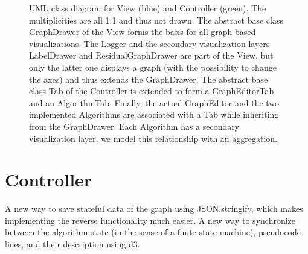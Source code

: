 \begin{figure}
\caption{UML class diagram for View (blue) and Controller (green). The multiplicities are all 1:1 and thus not drawn. The abstract base class GraphDrawer of the View forms the basis for all graph-based visualizations. The Logger and the secondary visualization layers LabelDrawer and ResidualGraphDrawer are part of the View, but only the latter one displays a graph (with the possibility to change the axes) and thus extends the GraphDrawer. The abstract base class Tab of the Controller is extended to form a GraphEditorTab and an AlgorithmTab. Finally, the actual GraphEditor and the two implemented Algorithms are associated with a Tab while inheriting from the GraphDrawer. Each Algorithm has a secondary visualization layer, we model this relationship with an aggregation.}
\end{figure}


\section{Controller}
	A new way to save stateful data of the graph using JSON.stringify, which makes implementing the reverse functionality much easier. A new way to synchronize between the algorithm state (in the sense of a finite state machine), pseudocode lines, and their description using d3.
